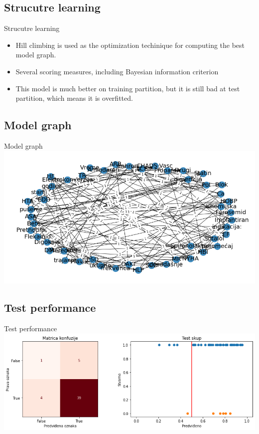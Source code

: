 \documentclass[hyperref={bookmarks=false}]{beamer}
\begin{document}
\subsection{Strucutre learning}
\begin{frame}{Strucutre learning}
\begin{itemize}
    \item Hill climbing is used as the optimization techinique for computing the best model graph.
    \item Several scoring measures, including Bayesian information criterion
    \item This model is much better on training partition, but it is still bad at test partition, which means it is overfitted.
\end{itemize}
\end{frame}

\subsection{Model graph}
\begin{frame}{Model graph}
\includegraphics[width=\textwidth]{learn1.png}
\end{frame}

\subsection{Test performance}
\begin{frame}{Test performance}
\includegraphics[width=\textwidth]{learn2.png}
\end{frame}
\end{document}
